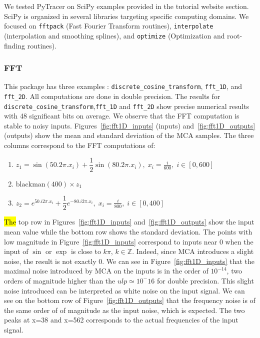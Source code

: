 \documentclass[10pt,journal,compsoc]{IEEEtran}
\newcommand{\pytracer}[0]{PyTracer\xspace}
\DeclareRobustCommand{\add}[1]{{\sethlcolor{lightgreen}\hl{#1}}}
\begin{document}
We tested \pytracer on SciPy examples provided in the tutorial website section.
SciPy is organized in several libraries targeting specific computing domains. We
focused on \texttt{fftpack} (Fast Fourier Transform routines),
\texttt{interpolate} (interpolation and smoothing splines), and
\texttt{optimize} (Optimization and root-finding routines).

\subsubsection{FFT}

This package has three examples : \texttt{discrete\_cosine\_transform},
\texttt{fft\_1D}, and \texttt{fft\_2D}. All computations are done in double
precision. The results for \texttt{discrete\_cosine\_transform},\texttt{fft\_1D}
and  \texttt{fft\_2D} show precise numerical results with 48 significant bits on
average. We observe that the FFT computation is stable to noisy inputs.
Figures~\ref{fig:fft1D_inputs} (inputs) and~\ref{fig:fft1D_outputs} (outputs)
show the mean and standard deviation of the MCA samples. The three columns
correspond to the FFT computations of: 
\begin{enumerate}
    \item $z_1 = \sin(50 . 2\pi . x_i) + \dfrac{1}{2} \sin(80 . 2\pi . x_i),\; x_i = \frac{i}{600},\; i \in [0,600]$
    \item $\mathrm{blackman}(400) \times z_1$
    \item $ z_2= e^{50 . i 2\pi . x_i} + \dfrac{1}{2} e^{-80 . i2\pi .x_i },\; x_i = \frac{i}{800},\; i \in [0,400] $
\end{enumerate}

\add{The} top row in Figures~\ref{fig:fft1D_inputs} and~\ref{fig:fft1D_outputs} show the
input mean value while the bottom row shows the standard deviation. The points
with low magnitude in Figure~\ref{fig:fft1D_inputs} correspond to inputs near 0
when the input of $\sin$ or $\exp$ is close to $k\pi$, $k \in \mathbb{Z}$.
Indeed, since MCA introduces a slight noise, the result is not exactly 0. We can
see in Figure~\ref{fig:fft1D_inputs} that the maximal noise introduced by MCA on
the inputs is in the order of $10^{-14}$, two orders of magnitude higher than
the $ulp \simeq 10^-16$ for double precision. This slight noise introduced can
be interpreted as white noise on the input signal. We can see on the bottom row
of Figure~\ref{fig:fft1D_outputs} that the frequency noise is of the same order
of of magnitude as the input noise, which is expected. The two peaks at x=38 and
x=562 corresponds to the actual frequencies of the input signal.
\end{document}
